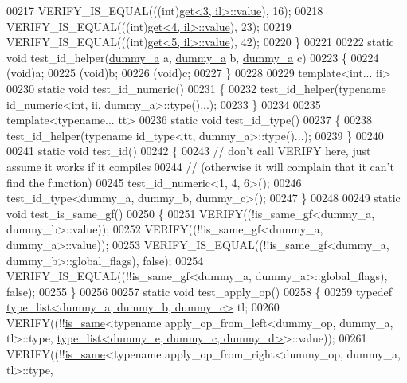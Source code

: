 \begin{DoxyCode}
00217   VERIFY\_IS\_EQUAL(((\textcolor{keywordtype}{int})\hyperlink{struct_eigen_1_1internal_1_1get}{get<3, il>::value}), 16);
00218   VERIFY\_IS\_EQUAL(((\textcolor{keywordtype}{int})\hyperlink{struct_eigen_1_1internal_1_1get}{get<4, il>::value}), 23);
00219   VERIFY\_IS\_EQUAL(((\textcolor{keywordtype}{int})\hyperlink{struct_eigen_1_1internal_1_1get}{get<5, il>::value}), 42);
00220 \}
00221 
00222 \textcolor{keyword}{static} \textcolor{keywordtype}{void} test\_id\_helper(\hyperlink{structdummy__a}{dummy\_a} a, \hyperlink{structdummy__a}{dummy\_a} b, \hyperlink{structdummy__a}{dummy\_a} c)
00223 \{
00224   (void)a;
00225   (void)b;
00226   (void)c;
00227 \}
00228 
00229 \textcolor{keyword}{template}<\textcolor{keywordtype}{int}... ii>
00230 \textcolor{keyword}{static} \textcolor{keywordtype}{void} test\_id\_numeric()
00231 \{
00232   test\_id\_helper(\textcolor{keyword}{typename} id\_numeric<int, ii, dummy\_a>::type()...);
00233 \}
00234 
00235 \textcolor{keyword}{template}<\textcolor{keyword}{typename}... tt>
00236 \textcolor{keyword}{static} \textcolor{keywordtype}{void} test\_id\_type()
00237 \{
00238   test\_id\_helper(\textcolor{keyword}{typename} id\_type<tt, dummy\_a>::type()...);
00239 \}
00240 
00241 \textcolor{keyword}{static} \textcolor{keywordtype}{void} test\_id()
00242 \{
00243   \textcolor{comment}{// don't call VERIFY here, just assume it works if it compiles}
00244   \textcolor{comment}{// (otherwise it will complain that it can't find the function)}
00245   test\_id\_numeric<1, 4, 6>();
00246   test\_id\_type<dummy\_a, dummy\_b, dummy\_c>();
00247 \}
00248 
00249 \textcolor{keyword}{static} \textcolor{keywordtype}{void} test\_is\_same\_gf()
00250 \{
00251   VERIFY((!is\_same\_gf<dummy\_a, dummy\_b>::value));
00252   VERIFY((!!is\_same\_gf<dummy\_a, dummy\_a>::value));
00253   VERIFY\_IS\_EQUAL((!!is\_same\_gf<dummy\_a, dummy\_b>::global\_flags), \textcolor{keyword}{false});
00254   VERIFY\_IS\_EQUAL((!!is\_same\_gf<dummy\_a, dummy\_a>::global\_flags), \textcolor{keyword}{false});
00255 \}
00256 
00257 \textcolor{keyword}{static} \textcolor{keywordtype}{void} test\_apply\_op()
00258 \{
00259   \textcolor{keyword}{typedef} \hyperlink{struct_eigen_1_1internal_1_1type__list}{type\_list<dummy\_a, dummy\_b, dummy\_c>} tl;
00260   VERIFY((!!\hyperlink{struct_eigen_1_1internal_1_1is__same}{is\_same}<\textcolor{keyword}{typename} apply\_op\_from\_left<dummy\_op, dummy\_a, tl>::type, 
      \hyperlink{struct_eigen_1_1internal_1_1type__list}{type\_list<dummy\_e, dummy\_c, dummy\_d>}>::value));
00261   VERIFY((!!\hyperlink{struct_eigen_1_1internal_1_1is__same}{is\_same}<\textcolor{keyword}{typename} apply\_op\_from\_right<dummy\_op, dummy\_a, tl>::type, 

\end{DoxyCode}
